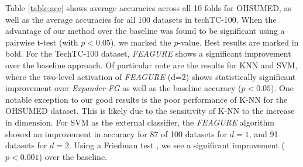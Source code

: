 \documentclass{article}
\theoremstyle{definition}
\begin{document}
Table \ref{table:acc} shows average accuracies across all 10 folds for OHSUMED, as well as the average accuracies for all 100 datasets in techTC-100. When the advantage of our method over the baseline was found to be significant using a pairwise t-test (with $p<0.05$), we marked the $p$-value. Best results are marked in bold.
For the TechTC-100 dataset, \emph{FEAGURE} shows a significant improvement over the baseline approach. %
Of particular note are the results for KNN and SVM, where the two-level activation of \emph{FEAGURE} (d=2) shows statistically significant improvement over \emph{Expander-FG} as well as the baseline accuracy ($p < 0.05$). 
One notable exception to our good results is the poor performance of K-NN for the OHSUMED dataset. This is likely due to the sensitivity of K-NN to the increase in dimension. 
For SVM as the external classifier, the \emph{FEAGURE} algorithm showed an improvement in accuracy for 87 of 100 datasets for $d=1$, and 91 datasets for $d=2$.
Using a Friedman test \citep{friedman1937use}, we see a significant improvement ($p<0.001$) over the baseline.

\end{document}

